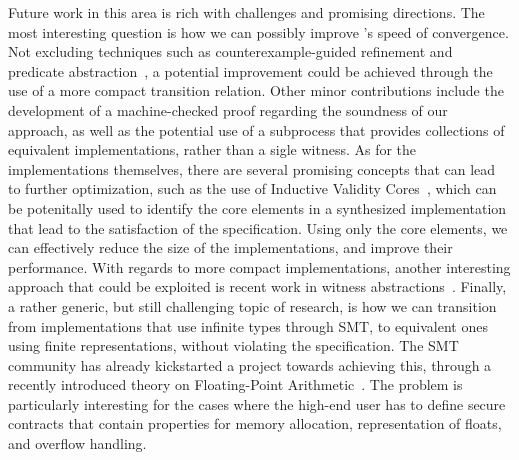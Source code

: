 Future work in this area is rich with challenges and promising directions. The
most interesting question is how we can possibly improve \jsynvg's
speed of convergence. Not excluding techniques such as counterexample-guided
refinement and predicate abstraction~\cite{walker2014predicate}, a potential
improvement could be achieved through the use of a more compact transition
relation. Other minor contributions include the development of a  machine-checked
proof regarding the soundness of our approach, as well as the potential use of a
subprocess that provides collections of equivalent implementations, rather than
a sigle witness. As for the implementations themselves, there are
several promising concepts that can lead to further optimization, such as the use of Inductive Validity Cores~\cite{Ghass16}, which can be potenitally used to identify the core elements in a synthesized implementation that lead to the satisfaction of the specification. Using only
the core elements, we can effectively reduce the size of the implementations,
and improve their performance. With regards to more compact implementations, another interesting approach that could be exploited is recent work in witness abstractions~\cite{jakobs2017compact}. Finally, a rather generic, but still challenging
topic of research, is how we can transition from implementations that use
infinite types through SMT, to equivalent ones using finite representations,
without violating the specification. The SMT community has already kickstarted a project towards achieving this, through a recently introduced theory on Floating-Point Arithmetic~\cite{brain2015automatable}. The problem is particularly interesting for the cases where the high-end user has to define secure contracts that contain properties for memory allocation, representation of floats, and overflow handling.
